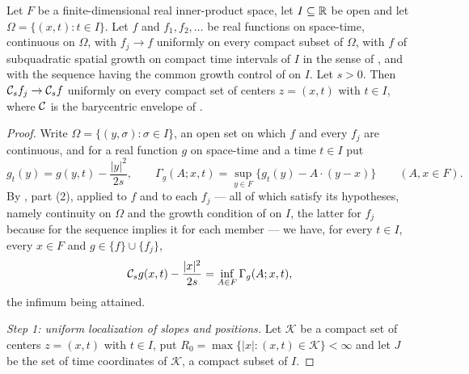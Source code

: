 \begin{lemma}
Let $F$ be a finite-dimensional real inner-product space, let $I\subseteq\mathbb{R}$ be
open and let $\Omega=\{(x,t):t\in I\}$. Let $f$ and $f_1,f_2,\ldots$ be real
functions on space-time, continuous on $\Omega$, with $f_j\to f$ uniformly on
every compact subset of $\Omega$, with $f$ of subquadratic spatial growth on
compact time intervals of $I$ in the sense of , and
with the sequence having the common growth control of
 on $I$. Let $s>0$. Then
$\mathcal{C}_sf_j\to\mathcal{C}_sf$ uniformly on every compact set of centers $z=(x,t)$ with
$t\in I$, where $\mathcal{C}$ is the barycentric envelope of .
\end{lemma}
\begin{proof}
Write $\Omega=\{(y,\sigma):\sigma\in I\}$, an open set on which $f$ and every
$f_j$ are continuous, and for a real function $g$ on space-time and a time
$t\in I$ put
\[
  g_t(y)=g(y,t)-\frac{|y|^2}{2s},
  \qquad
  \Gamma_g(A;x,t)=\sup_{y\in F}\bigl\{g_t(y)-A\cdot(y-x)\bigr\}
  \qquad(A,x\in F).
\]
By , part (2), applied to $f$ and to each $f_j$ — all of
which satisfy its hypotheses, namely continuity on $\Omega$ and the growth
condition of  on $I$, the latter for $f_j$ because
 for the sequence implies it for each member —
we have, for every $t\in I$, every $x\in F$ and $g\in\{f\}\cup\{f_j\}$,
\begin{equation}\label{eq:bes-duality}
  \mathcal{C}_sg(x,t)-\frac{|x|^2}{2s}=\inf_{A\in F}\Gamma_g(A;x,t),
\end{equation}
the infimum being attained.

\emph{Step 1: uniform localization of slopes and positions.}
Let $\mathcal K$ be a compact set of centers $z=(x,t)$ with $t\in I$, put
$R_0=\max\{|x|:(x,t)\in\mathcal K\}<\infty$ and let $J$ be the set of time
coordinates of $\mathcal K$, a compact subset of $I$.


\end{proof}

